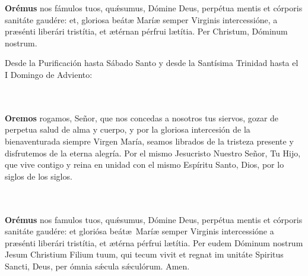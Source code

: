 \documentclass[10pt,a4paper,oneside]{book}
\begin{document}
\begin{minipage}[t]{0.475\textwidth}
    \textbf{Orémus}
     nos fámulos tuos, qu{\'\ae}sumus, Dómine Deus, perpétua mentis et córporis sanitáte gaudére: et, gloriosa beát{\ae}
    Marí{\ae} semper Virginis intercessióne, a pr{\ae}sénti liberári tristítia, et {\ae}térnan pérfrui l{\ae}títia. Per Christum, Dóminum nostrum.
    \\
\end{minipage}

\newpage

\noindent\small{Desde la Purificación hasta Sábado Santo y desde la Santísima Trinidad hasta el I Domingo de Adviento:}\\
\begin{minipage}[t]{0.475\textwidth}
    \ruegapornosotrossalve\\\\
    \textbf{Oremos}
     rogamos, Señor, que nos concedas a nosotros tus siervos, gozar de perpetua salud de alma y cuerpo, y por la gloriosa intercesión de la bienaventurada siempre Virgen 
    María, seamos librados de la tristeza presente y disfrutemos de la eterna alegría. Por el mismo Jesucristo Nuestro Señor, Tu Hijo, que vive contigo y reina en unidad con el mismo Espíritu
    Santo, Dios, por lo siglos de los siglos.
\end{minipage}
\begin{minipage}[t]{0.475\textwidth}
    \orapronobissalve\\\\
    \textbf{Orémus} 
     nos famulos tuos, qu{\'\ae}sumus, Dómine Deus, perpétua mentis et córporis sanitáte gaudére: et gloriósa beát{\ae}\ Marí{\ae} semper Virginis intercessióne
    a pr{\ae}sénti liberári tristítia, et {\ae}térna pérfrui l{\ae}títia. Per eudem Dóminum nostrum Jesum Christium Filium tuum, qui tecum vivit et regnat im unitáte Spiritus Sancti, 
    Deus, per ómnia s{\'\ae}cula s{\'\ae}culórum. Amen.\\
\end{minipage}

\bigskip
\end{document}
